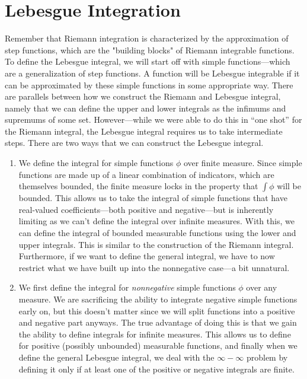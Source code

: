 \section{Lebesgue Integration}

  Remember that Riemann integration is characterized by the approximation of step functions, which are the "building blocks" of Riemann integrable functions. To define the Lebesgue integral, we will start off with simple functions---which are a generalization of step functions. A function will be Lebesgue integrable if it can be approximated by these simple functions in some appropriate way. There are parallels between how we construct the Riemann and Lebesgue integral, namely that we can define the upper and lower integrals as the infimums and supremums of some set. However---while we were able to do this in ``one shot'' for the Riemann integral, the Lebesgue integral requires us to take intermediate steps. There are two ways that we can construct the Lebesgue integral. 
  \begin{enumerate}
    \item We define the integral for simple functions $\phi$ over finite measure. Since simple functions are made up of a linear combination of indicators, which are themselves bounded, the finite measure locks in the property that $\int \phi$ will be bounded. This allows us to take the integral of simple functions that have real-valued coefficients---both positive and negative---but is inherently limiting as we can't define the integral over infinite measures. With this, we can define the integral of bounded measurable functions using the lower and upper integrals. This is similar to the construction of the Riemann integral. Furthermore, if we want to define the general integral, we have to now restrict what we have built up into the nonnegative case---a bit unnatural. 

    \item We first define the integral for \textit{nonnegative} simple functions $\phi$ over any measure. We are sacrificing the ability to integrate negative simple functions early on, but this doesn't matter since we will split functions into a positive and negative part anyways. The true advantage of doing this is that we gain the ability to define integrals for infinite measures. This allows us to define for positive (possibly unbounded) measurable functions, and finally when we define the general Lebesgue integral, we deal with the $\infty - \infty$ problem by defining it only if at least one of the positive or negative integrals are finite. 
  \end{enumerate}

